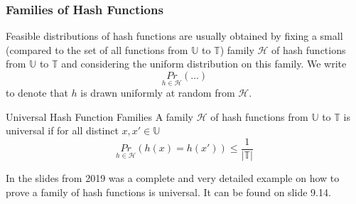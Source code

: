 \documentclass{panikzettel}
\begin{document}
\subsubsection{Families of Hash Functions}
Feasible distributions of hash functions are usually obtained by fixing a small (compared to the set of all functions from $\mathbb{U}$ to $\mathbb{T}$) family $\mathcal{H}$ of hash functions from $\mathbb{U}$ to $\mathbb{T}$ and considering the uniform distribution on
this family. We write
\[
\underset{h\in\mathcal{H}}{Pr}(...)
\]
to denote that $h$ is drawn uniformly at random from $\mathcal{H}$.

\begin{defi}{Universal Hash Function Families}
A family $\mathcal{H}$ of hash functions from $\mathbb{U}$ to $\mathbb{T}$ is universal if for all distinct $x,x'\in \mathbb{U}$
\[
\underset{h\in\mathcal{H}}{Pr}(h(x)=h(x'))\leq \frac{1}{|\mathbb{T}|}
\]
\end{defi}

In the slides from 2019 was a complete and very detailed example on how to prove a family of hash functions is universal. It can be found on slide 9.14.
\end{document}
